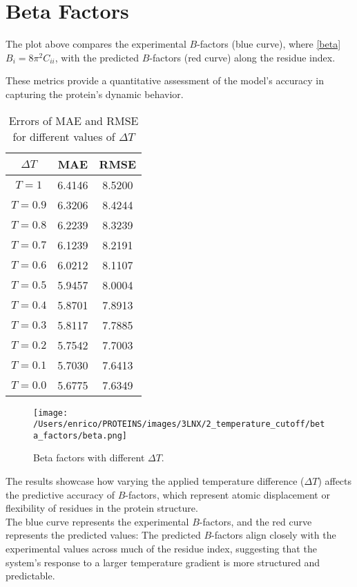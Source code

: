 \documentclass[English, Lau, oneside]{sapthesis}
\begin{document}
\newpage
\newpage




\section{Beta Factors}
\noindent The plot above compares the experimental \( B \)-factors (blue curve), where \eqref{beta} $B_i = 8\pi^2 C_{ii}$, with the predicted \( B \)-factors (red curve) along the residue index. 

These metrics provide a quantitative assessment of the model's accuracy in capturing the protein's dynamic behavior.
\begin{table}[ht]
    \centering
    \begin{tabular}{|c|c|c|}
        \hline
        $\Delta T$ & MAE & RMSE \\ \hline
        $T=1$ & 6.4146 &  8.5200 \\ \hline
        $T=0.9$ & 6.3206 &  8.4244 \\ \hline
        $T=0.8$ & 6.2239 &  8.3239 \\ \hline
        $T=0.7$ & 6.1239 &  8.2191 \\ \hline
        $T=0.6$ & 6.0212 &  8.1107\\ \hline
        $T=0.5$ & 5.9457 &  8.0004 \\ \hline
        $T=0.4$ & 5.8701 &  7.8913 \\ \hline
        $T=0.3$ & 5.8117 &  7.7885 \\ \hline
        $T=0.2$ & 5.7542 &  7.7003 \\ \hline
        $T=0.1$ & 5.7030 &  7.6413 \\ \hline
        $T=0.0$ & 5.6775 &  7.6349 \\ \hline
    \end{tabular}
    \caption{Errors of MAE and RMSE for different values of $\Delta T$}
    \label{tab:mae_rmse}
\end{table}


\begin{figure}[h!]
    \centering
    \texttt{[image: /Users/enrico/PROTEINS/images/3LNX/2\_temperature\_cutoff/beta\_factors/beta.png]}
    \caption{Beta factors with different $\Delta T$.}
\end{figure}


The results showcase how varying the applied temperature difference (\(\Delta T\)) affects the predictive accuracy of \( B \)-factors, which represent atomic displacement or flexibility of residues in the protein structure. \\
The blue curve represents the experimental \( B \)-factors, and the red curve represents the predicted values:
The predicted \( B \)-factors align closely with the experimental values across much of the residue index, suggesting that the system's response to a larger temperature gradient is more structured and predictable.
\end{document}
